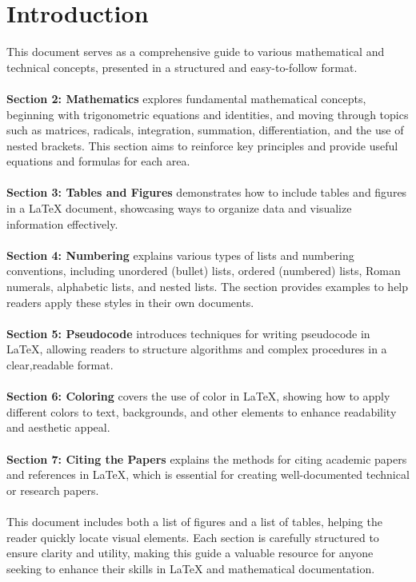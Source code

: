 \documentclass[12pt,a4paper]{article}
\begin{document}
	\section{Introduction}
	This document serves as a comprehensive guide to various mathematical and technical concepts, presented in a structured and easy-to-follow format.\\ \\
	\textbf{Section 2: Mathematics} explores fundamental mathematical concepts, beginning with trigonometric equations and identities, and moving through topics
	such as matrices, radicals, integration, summation, differentiation, and the use
	of nested brackets. This section aims to reinforce key principles and provide
	useful equations and formulas for each area. \\ \\
	\textbf{Section 3: Tables and Figures} demonstrates how to include tables and
	figures in a LaTeX document, showcasing ways to organize data and visualize
	information effectively.\\ \\
	\textbf{Section 4: Numbering} explains various types of lists and numbering conventions, including unordered (bullet) lists, ordered (numbered) lists, Roman numerals, alphabetic lists, and nested lists. The section provides examples to
	help readers apply these styles in their own documents. \\ \\
	\textbf{Section 5: Pseudocode} introduces techniques for writing pseudocode in LaTeX, allowing readers to structure algorithms and complex procedures in a clear,readable format. \\ \\
	\textbf{Section 6: Coloring} covers the use of color in LaTeX, showing how to apply
	different colors to text, backgrounds, and other elements to enhance readability
	and aesthetic appeal. \\ \\
	\textbf{Section 7: Citing the Papers}  explains the methods for citing academic
	papers and references in LaTeX, which is essential for creating well-documented
	technical or research papers. \\ \\
	This document includes both a list of figures and a list of tables, helping the
	reader quickly locate visual elements. Each section is carefully structured to ensure clarity and utility, making this guide a valuable resource for anyone seeking
	to enhance their skills in LaTeX and mathematical documentation.
	
\end{document}
